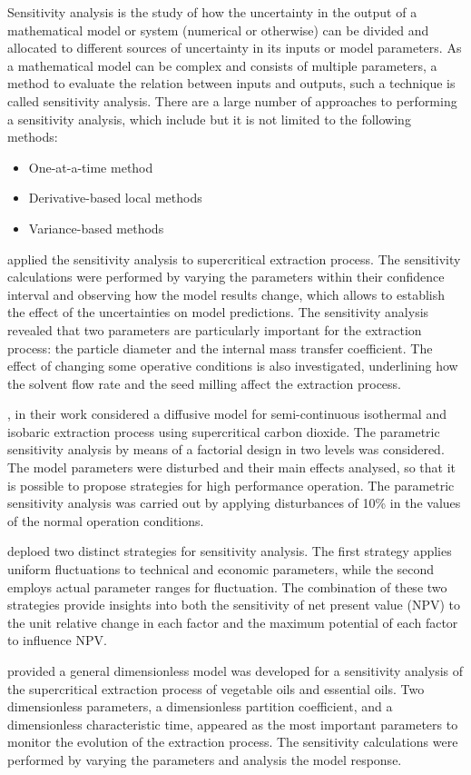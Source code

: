 \documentclass[../Article_Model_Parameters.tex]{subfiles}
\begin{document}
	
	Sensitivity analysis is the study of how the uncertainty in the output of a mathematical model or system (numerical or otherwise) can be divided and allocated to different sources of uncertainty in its inputs or model parameters. As a mathematical model can be complex and consists of multiple parameters, a method to evaluate the relation between inputs and outputs, such a technique is called sensitivity analysis. There are a large number of approaches to performing a sensitivity analysis, which include but it is not limited to the following methods:
	
	\begin{itemize}
		\item One-at-a-time method
		\item Derivative-based local methods
		\item Variance-based methods
	\end{itemize}
	
	\citet{Fiori_2007} applied the sensitivity analysis to supercritical extraction process. The sensitivity calculations were performed by varying the parameters within their confidence interval and observing how the model results change, which allows to establish the effect of the uncertainties on model predictions. The sensitivity analysis revealed that two parameters are particularly important for the extraction process: the particle diameter and the internal mass transfer coefficient. The effect of changing some operative conditions is also investigated, underlining how the solvent flow rate and the seed milling affect the extraction process.
	
	\citet{Santos2000}, in their work considered a diffusive model for semi-continuous isothermal and isobaric extraction process using supercritical carbon dioxide. The parametric sensitivity analysis by means of a factorial design in two levels was considered. The model parameters were disturbed and their main effects analysed, so that it is possible to propose strategies for high performance operation. The parametric sensitivity analysis was carried out by applying disturbances of 10\% in the values of the normal operation conditions.
	
	\citet{Hatami2024} deploed two distinct strategies for sensitivity analysis. The first strategy applies uniform fluctuations to technical and economic parameters, while the second employs actual parameter ranges for fluctuation. The combination of these two strategies provide insights into both the sensitivity of net present value (NPV) to the unit relative change in each factor and the maximum potential of each factor to influence NPV.
	
	\citet{Poletto1996} provided a general dimensionless model was developed for a sensitivity analysis of the supercritical extraction process of vegetable oils and essential oils. Two dimensionless parameters, a dimensionless partition coefficient, and a dimensionless characteristic time, appeared as the most important parameters to monitor the evolution of the extraction process. The sensitivity calculations were performed by varying the parameters and analysis the model response.
	
\end{document}
